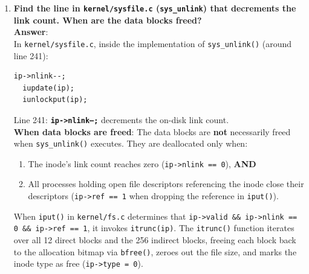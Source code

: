 \documentclass[12pt,a4paper]{article}
\begin{document}
\begin{enumerate}
    \item \textbf{Find the line in \texttt{kernel/sysfile.c} (\texttt{sys\_unlink}) that decrements the link count. When are the data blocks freed?} \\
    \textbf{Answer}: \\
    In \texttt{kernel/sysfile.c}, inside the implementation of \texttt{sys\_unlink()} (around line 241):
    \begin{lstlisting}[style=cstyle]
  ip->nlink--;
  iupdate(ip);
  iunlockput(ip);
    \end{lstlisting}
    Line 241: \textbf{\texttt{ip->nlink--;}} decrements the on-disk link count. \\
    \textbf{When data blocks are freed}: The data blocks are \textbf{not} necessarily freed when \texttt{sys\_unlink()} executes. They are deallocated only when:
    \begin{enumerate}
        \item The inode's link count reaches zero (\texttt{ip->nlink == 0}), \textbf{AND}
        \item All processes holding open file descriptors referencing the inode close their descriptors (\texttt{ip->ref == 1} when dropping the reference in \texttt{iput()}).
    \end{enumerate}
    When \texttt{iput()} in \texttt{kernel/fs.c} determines that \texttt{ip->valid \&\& ip->nlink == 0 \&\& ip->ref == 1}, it invokes \texttt{itrunc(ip)}. The \texttt{itrunc()} function iterates over all 12 direct blocks and the 256 indirect blocks, freeing each block back to the allocation bitmap via \texttt{bfree()}, zeroes out the file size, and marks the inode type as free (\texttt{ip->type = 0}).


\end{enumerate}
\end{document}
